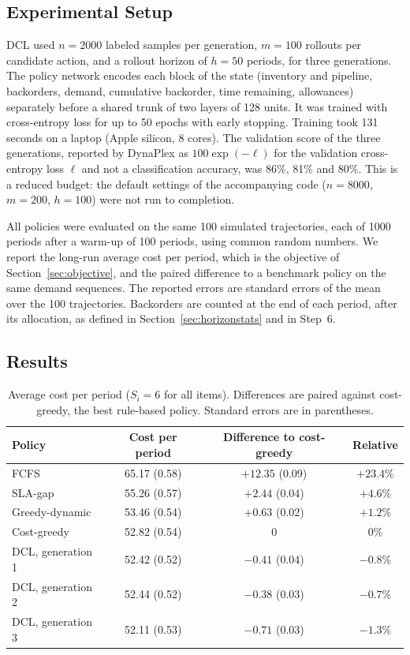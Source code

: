 \documentclass[11pt, a4paper]{article}
\theoremstyle{definition}
\theoremstyle{remark}
\begin{document}
\subsection{Experimental Setup}

DCL used $n = 2000$ labeled samples per generation, $m = 100$ rollouts per candidate action, and a rollout horizon of $h = 50$ periods, for three generations. The policy network encodes each block of the state (inventory and pipeline, backorders, demand, cumulative backorder, time remaining, allowances) separately before a shared trunk of two layers of 128 units. It was trained with cross-entropy loss for up to 50 epochs with early stopping. Training took 131 seconds on a laptop (Apple silicon, 8 cores). The validation score of the three generations, reported by DynaPlex as $100 \exp(-\ell)$ for the validation cross-entropy loss $\ell$ and not a classification accuracy, was 86\%, 81\% and 80\%. This is a reduced budget: the default settings of the accompanying code ($n = 8000$, $m = 200$, $h = 100$) were not run to completion.

All policies were evaluated on the same 100 simulated trajectories, each of 1000 periods after a warm-up of 100 periods, using common random numbers. We report the long-run average cost per period, which is the objective of Section~\ref{sec:objective}, and the paired difference to a benchmark policy on the same demand sequences. The reported errors are standard errors of the mean over the 100 trajectories. Backorders are counted at the end of each period, after its allocation, as defined in Section~\ref{sec:horizonstats} and in Step~6.

\subsection{Results}

\begin{table}[H]
    \centering
    \caption{Average cost per period ($S_i = 6$ for all items). Differences are paired against cost-greedy, the best rule-based policy. Standard errors are in parentheses.}
    \label{tab:results}
    \begin{tabular}{lccc}
        \toprule
        Policy & Cost per period & Difference to cost-greedy & Relative \\
        \midrule
        FCFS            & 65.17 (0.58) & $+12.35$ (0.09) & $+23.4\%$ \\
        SLA-gap         & 55.26 (0.57) & $+2.44$ (0.04)  & $+4.6\%$ \\
        Greedy-dynamic  & 53.46 (0.54) & $+0.63$ (0.02)  & $+1.2\%$ \\
        Cost-greedy     & 52.82 (0.54) & $0$             & $0\%$ \\
        \midrule
        DCL, generation 1 & 52.42 (0.52) & $-0.41$ (0.04) & $-0.8\%$ \\
        DCL, generation 2 & 52.44 (0.52) & $-0.38$ (0.03) & $-0.7\%$ \\
        DCL, generation 3 & 52.11 (0.53) & $-0.71$ (0.03) & $-1.3\%$ \\
        \bottomrule
    \end{tabular}
\end{table}
\end{document}
